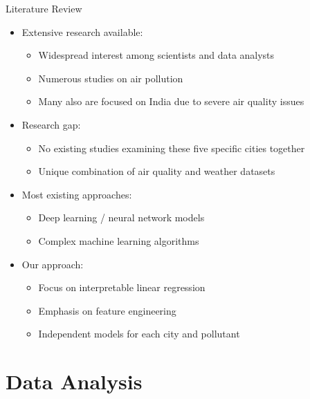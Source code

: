 \documentclass[svgnames, 10pt]{beamer}
\begin{document}
\begin{frame}{Literature Review}
    \begin{itemize}
        \item Extensive research available:
            \begin{itemize}
                \item Widespread interest among scientists and data analysts
                \item Numerous studies on air pollution
                \item Many also are focused on India due to severe air quality issues
            \end{itemize}
        \item Research gap:
            \begin{itemize}
                \item No existing studies examining these five specific cities together
                \item Unique combination of air quality and weather datasets
            \end{itemize}
        \item Most existing approaches:
            \begin{itemize}
                \item Deep learning / neural network models
                \item Complex machine learning algorithms
            \end{itemize}
        \item Our approach:
            \begin{itemize}
                \item Focus on interpretable linear regression
                \item Emphasis on feature engineering
                \item Independent models for each city and pollutant
            \end{itemize}
    \end{itemize}
\end{frame}

\section{Data Analysis}
\end{document}
